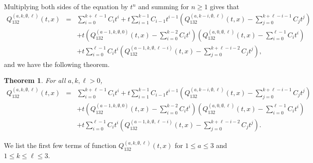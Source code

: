 \documentclass[
final,nomarks
]{dmtcs-episciences}
\newtheorem{theorem}{Theorem}
\newcommand{\Qmm}[1]{Q_{132}^{(#1)}(t,x)}
\begin{document}
Multiplying both sides of the equation by \begin{math}t^n\end{math} and summing for \begin{math}n\geq 1\end{math} gives that
\begin{eqnarray}
	\Qmm{a,k,\emptyset,\ell}&=&\sum_{i=0}^{k+\ell-1}C_i t^i+t\sum_{i=1}^{k-1}C_{i-1}t^{i-1}(\Qmm{a,k-i,\emptyset,\ell}-\sum_{j=0}^{k+\ell-i-1}C_j t^j)\nonumber\\\nonumber
	&&+t(\Qmm{a-1,k,\emptyset,0}-\sum_{i=0}^{k-2}C_i t^i)(\Qmm{a,0,\emptyset,\ell}-\sum_{i=0}^{\ell-1}C_i t^i)\\
	&&+t\sum_{i=0}^{\ell-1}C_it^i(\Qmm{a-1,k,\emptyset,\ell-i}-\sum_{j=0}^{k+\ell-i-2}C_j t^j),
\end{eqnarray}
and we have the following theorem.

\begin{theorem}\label{theorem:10}
	For all \begin{math}a,k,\ell>0\end{math},
	\begin{eqnarray}
		\Qmm{a,k,\emptyset,\ell}&=&\sum_{i=0}^{k+\ell-1}C_i t^i+t\sum_{i=1}^{k-1}C_{i-1}t^{i-1}(\Qmm{a,k-i,\emptyset,\ell}-\sum_{j=0}^{k+\ell-i-1}C_j t^j)\nonumber\\\nonumber
		&&+t(\Qmm{a-1,k,\emptyset,0}-\sum_{i=0}^{k-2}C_i t^i)(\Qmm{a,0,\emptyset,\ell}-\sum_{i=0}^{\ell-1}C_i t^i)\\
		&&+t\sum_{i=0}^{\ell-1}C_it^i(\Qmm{a-1,k,\emptyset,\ell-i}-\sum_{j=0}^{k+\ell-i-2}C_j t^j).
	\end{eqnarray}
\end{theorem}

We list the first few terms of function \begin{math}\Qmm{a,k,\emptyset,\ell}\end{math} for \begin{math}1\leq a\leq 3\end{math} and \begin{math}1\leq k\leq \ell\leq 3\end{math}.
\end{document}
